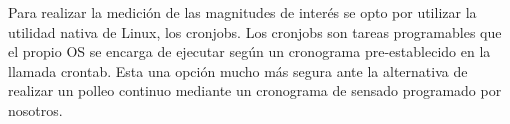 Para realizar la medición de las magnitudes de interés se opto por utilizar la utilidad nativa de Linux, los cronjobs. Los cronjobs son tareas programables que el propio OS se encarga de ejecutar según un cronograma pre-establecido en la llamada crontab. Esta una opción mucho más segura ante la alternativa de realizar un polleo continuo mediante un cronograma de sensado programado por nosotros.











